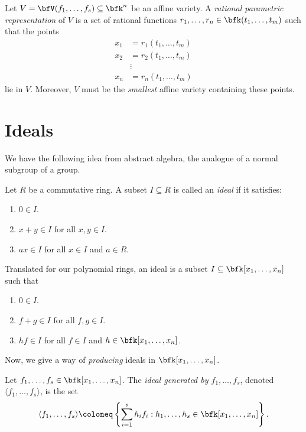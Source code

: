 \documentclass{article}
\begin{document}
\begin{definition}
    Let $V=\bfV(f_1,\ldots,f_s) \subseteq \bfk^n$ be an affine variety.
    A \textit{rational parametric representation} of $V$ is a set of rational functions $r_1,\ldots,r_n \in \bfk(t_1,\ldots,t_m)$ such that the points
    \begin{align*}
        x_1 &= r_1(t_1,\ldots,t_m) \\
        x_2 &= r_2(t_1,\ldots,t_m) \\
            &\vdots \\
        x_n &= r_n(t_1,\ldots,t_m)
    \end{align*}
    lie in $V$.
    Moreover, $V$ must be the \textit{smallest} affine variety containing these points.
\end{definition}

\section{Ideals}

We have the following idea from abstract algebra, the analogue of a normal subgroup of a group.

\begin{definition}
    Let $R$ be a commutative ring.
    A subset $I \subseteq R$ is called an \textit{ideal} if it satisfies:
    \begin{enumerate}[label=(\roman*)]
        \item $0 \in I$.
        \item $x+y \in I$ for all $x,y \in I$.
        \item $ax \in I$ for all $x \in I$ and $a \in R$.
    \end{enumerate}
\end{definition}

Translated for our polynomial rings, an ideal is a subset $I \subseteq \bfk[x_1,\ldots,x_n]$ such that
\begin{enumerate}[label=(\roman*)]
    \item $0 \in I$.
    \item $f+g \in I$ for all $f,g \in I$.
    \item $hf \in I$ for all $f \in I$ and $h \in \bfk[x_1,\ldots,x_n]$.
\end{enumerate}

Now, we give a way of \textit{producing} ideals in $\bfk[x_1,\ldots,x_n]$.

\begin{definition}
    Let $f_1,\ldots,f_s \in \bfk[x_1,\ldots,x_n]$.
    The \textit{ideal generated by $f_1,\ldots,f_s$}, denoted $\langle f_1,\ldots,f_s \rangle$, is the set
    \[
        \langle f_1,\ldots,f_s \rangle \coloneq \left\{\sum_{i=1}^s h_if_i : h_1,\ldots,h_s \in \bfk[x_1,\ldots,x_n]\right\}.
    \]
\end{definition}
\end{document}
